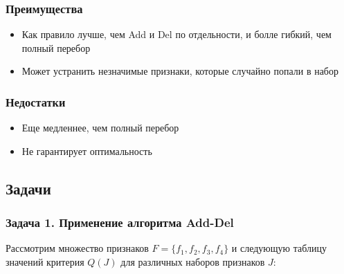 \subsubsection*{Преимущества}

\begin{itemize}

    \item Как правило лучше, чем Add и Del по отдельности, и болле гибкий, чем полный перебор

    \item Может устранить незначимые признаки, которые случайно попали в набор
    
\end{itemize}

\subsubsection*{Недостатки}

\begin{itemize}

    \item Еще медленнее, чем полный перебор

    \item Не гарантирует оптимальность
    
\end{itemize}



\bigskip
\bigskip




\subsection*{Задачи}



\subsubsection*{Задача 1. Применение алгоритма Add-Del}

Рассмотрим множество признаков \( F = \{f_1, f_2, f_3, f_4\} \) и следующую таблицу значений критерия \( Q(J) \) для различных наборов признаков \( J \):

